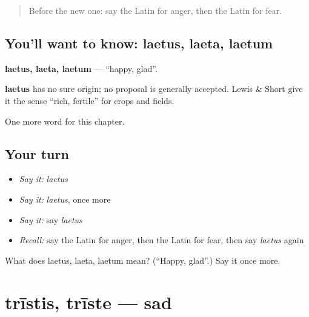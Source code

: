 \label{lesson:LA-C69-laetus}



\begin{quote}
Before the new one: say the Latin for anger, then the Latin for fear.
\end{quote}

\subsection*{You'll want to know: laetus, laeta, laetum}
\textbf{laetus, laeta, laetum} — \textquotedblleft{}happy, glad\textquotedblright{}.

\begin{cousinweb}
\textbf{laetus} has no sure origin; no proposal is generally accepted. Lewis \& Short give it the sense \textquotedblleft{}rich, fertile\textquotedblright{} for crops and fields.
\end{cousinweb}

\begin{grammarlens}[title={What you've built}]
One more word for this chapter.
\end{grammarlens}

\subsection*{Your turn}
\begin{itemize}
\raggedright
  \item \emph{Say it:} \emph{laetus}
  \item \emph{Say it:} \emph{laetus}, once more
  \item \emph{Say it:} say \emph{laetus}
  \item \emph{Recall:} say the Latin for anger, then the Latin for fear, then say \emph{laetus} again
\end{itemize}

\begin{tcolorbox}[breakable,colback=teal!4,colframe=teal!35!black,title={Before you move on}]
What does laetus, laeta, laetum mean? (\textquotedblleft{}Happy, glad\textquotedblright{}.) Say it once more.
\end{tcolorbox}
\section[trīstis, trīste]{trīstis, trīste — sad}

\label{lesson:LA-C69-tristis}



